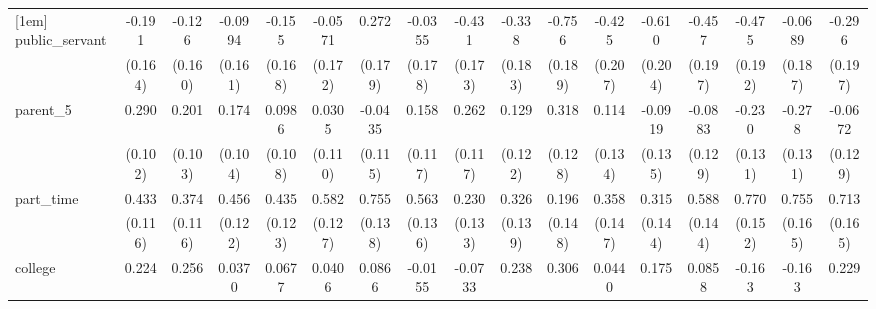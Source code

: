 {\begin{tabular}{l*{16}{c}}
[1em]
public\_servant      &      -0.191         &      -0.126         &     -0.0994         &      -0.155         &     -0.0571         &       0.272         &     -0.0355         &      -0.431\sym{*}  &      -0.338         &      -0.756\sym{***}&      -0.425\sym{*}  &      -0.610\sym{**} &      -0.457\sym{*}  &      -0.475\sym{*}  &     -0.0689         &      -0.296         \\
                    &     (0.164)         &     (0.160)         &     (0.161)         &     (0.168)         &     (0.172)         &     (0.179)         &     (0.178)         &     (0.173)         &     (0.183)         &     (0.189)         &     (0.207)         &     (0.204)         &     (0.197)         &     (0.192)         &     (0.187)         &     (0.197)         \\
[1em]
parent\_5            &       0.290\sym{**} &       0.201         &       0.174         &      0.0986         &      0.0305         &     -0.0435         &       0.158         &       0.262\sym{*}  &       0.129         &       0.318\sym{*}  &       0.114         &     -0.0919         &     -0.0883         &      -0.230         &      -0.278\sym{*}  &     -0.0672         \\
                    &     (0.102)         &     (0.103)         &     (0.104)         &     (0.108)         &     (0.110)         &     (0.115)         &     (0.117)         &     (0.117)         &     (0.122)         &     (0.128)         &     (0.134)         &     (0.135)         &     (0.129)         &     (0.131)         &     (0.131)         &     (0.129)         \\
[1em]
part\_time           &       0.433\sym{***}&       0.374\sym{**} &       0.456\sym{***}&       0.435\sym{***}&       0.582\sym{***}&       0.755\sym{***}&       0.563\sym{***}&       0.230         &       0.326\sym{*}  &       0.196         &       0.358\sym{*}  &       0.315\sym{*}  &       0.588\sym{***}&       0.770\sym{***}&       0.755\sym{***}&       0.713\sym{***}\\
                    &     (0.116)         &     (0.116)         &     (0.122)         &     (0.123)         &     (0.127)         &     (0.138)         &     (0.136)         &     (0.133)         &     (0.139)         &     (0.148)         &     (0.147)         &     (0.144)         &     (0.144)         &     (0.152)         &     (0.165)         &     (0.165)         \\
[1em]
college             &       0.224         &       0.256         &      0.0370         &      0.0677         &      0.0406         &      0.0866         &     -0.0155         &     -0.0733         &       0.238         &       0.306         &      0.0440         &       0.175         &      0.0858         &      -0.163         &      -0.163         &       0.229         \\

\end{tabular}}
